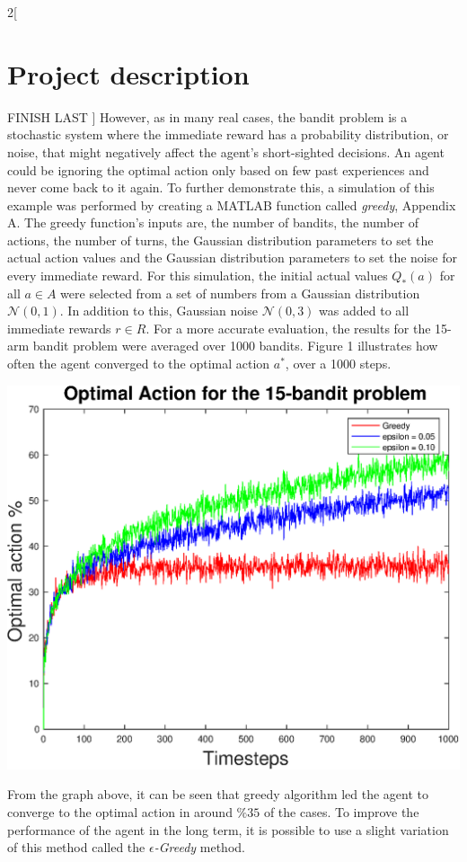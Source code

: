 \documentclass[a4paper]{article}
\newenvironment{Figure}
{\par\medskip\noindent\minipage{\linewidth}}
{\endminipage\par\medskip}
\begin{document}
\begin{multicols}{2}[
		\section*{Project description}
		FINISH LAST
		]
		However, as in many real cases, the bandit problem is a stochastic system where the immediate reward has a probability distribution, or noise, that might negatively affect the agent's short-sighted decisions. An agent could be ignoring the optimal action only based on few past experiences and never come back to it again. To further demonstrate this, a simulation of this example was performed by creating a MATLAB function called \textit{greedy}, Appendix A. The greedy function's inputs are, the number of bandits, the number of actions, the number of turns, the Gaussian distribution parameters to set the actual action values and the Gaussian distribution parameters to set the noise for every immediate reward. For this simulation, the initial actual values $Q_*(a)$ for all $a \in A$ were selected from a set of numbers from a Gaussian distribution $\mathcal{N}(0,1)$. In addition to this, Gaussian noise $\mathcal{N}(0,3)$ was added to all immediate rewards $r \in R$. For a more accurate evaluation, the results for the 15-arm bandit problem were averaged over 1000 bandits. Figure 1 illustrates how often the agent converged to the optimal action $a^*$, over a 1000 steps. \par
		
		\begin{Figure}
			\centering
			\includegraphics[width=\linewidth]{allplot2.eps}
		\end{Figure}
		
		From the graph above, it can be seen that greedy algorithm led the agent to converge to the optimal action in around $\%35$ of the cases. To improve the performance of the agent in the long term, it is possible to use a slight variation of this method called the \textit{$\epsilon$-Greedy} method. \par
		

\end{multicols}
\end{document}

